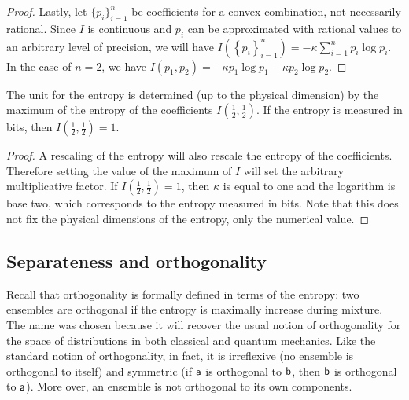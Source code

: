 \begin{mathSection}
\begin{proof}
	Lastly, let $\{p_i\}_{i=1}^{n}$ be coefficients for a convex combination, not necessarily rational. Since $I$ is continuous and $p_i$ can be approximated with rational values to an arbitrary level of precision, we will have $I\left(\left\{ p_i\right\}_{i=1}^{n}\right) = - \kappa \sum_{i=1}^{n} p_i \log p_i$. In the case of $n=2$, we have $I(p_1, p_2) = - \kappa p_1 \log p_1 - \kappa p_2 \log p_2$.	
\end{proof}

\begin{coro}
	The unit for the entropy is determined (up to the physical dimension) by the maximum of the entropy of the coefficients $I\left(\frac{1}{2}, \frac{1}{2}\right)$. If the entropy is measured in bits, then $I\left(\frac{1}{2}, \frac{1}{2}\right) = 1$.
\end{coro}

\begin{proof}
	A rescaling of the entropy will also rescale the entropy of the coefficients. Therefore setting the value of the maximum of $I$ will set the arbitrary multiplicative factor. If $I\left(\frac{1}{2}, \frac{1}{2}\right) = 1$, then $\kappa$ is equal to one and the logarithm is base two, which corresponds to the entropy measured in bits. Note that this does not fix the physical dimensions of the entropy, only the numerical value.
\end{proof}
\end{mathSection}

\subsection{Separateness and orthogonality}

Recall that orthogonality is formally defined in terms of the entropy: two ensembles are orthogonal if the entropy is maximally increase during mixture. The name was chosen because it will recover the usual notion of orthogonality for the space of distributions in both classical and quantum mechanics. Like the standard notion of orthogonality, in fact, it is irreflexive (no ensemble is orthogonal to itself) and symmetric (if $\ens[a]$ is orthogonal to $\ens[b]$, then $\ens[b]$ is orthogonal to $\ens[a]$). More over, an ensemble is not orthogonal to its own components.

